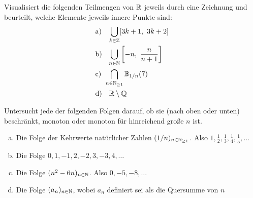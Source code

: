 \begin{aufg}
    Visualisiert die folgenden Teilmengen von $\mathbb R$ jeweils durch eine Zeichnung und beurteilt, welche Elemente jeweils innere Punkte sind:
    \begin{align*}
        &\text{a)} && \smashoperator[l]{\bigcup_{k\in \Z}} [3k+1,\ 3k+2] \\
        &\text{b)} && \smashoperator[l]{\bigcup_{n\in \N}} \left[ -n,\ \frac{n}{n+1} \right] \\
        &\text{c)} && \smashoperator[l]{\bigcap_{n\in \N_{\ge 1}}} \bbB_{1/n}(7) \\
        &\text{d)} && \R\setminus\Q
    \end{align*}
\end{aufg}


\begin{aufg}
    Untersucht jede der folgenden Folgen darauf, ob sie (nach oben oder unten) beschränkt, monoton oder monoton für hinreichend große $n$ ist.
    \begin{enumerate}[a)]
        \item Die Folge der Kehrwerte natürlicher Zahlen $(1/n)_{n\in \mathbb N_{\ge 1}}$. Also $1,\frac{1}{2},\frac{1}{3},\frac{1}{4},\frac{1}{5},\dots$
        \item Die Folge $0,1,-1,2,-2,3,-3,4,\dots$
        \item Die Folge $(n^2-6n)_{n\in \mathbb N}$. Also $0,-5,-8,\dots$
        \item Die Folge $(a_n)_{n\in \mathbb N}$, wobei $a_n$ definiert sei als die Quersumme von $n$
    \end{enumerate}
\end{aufg}

